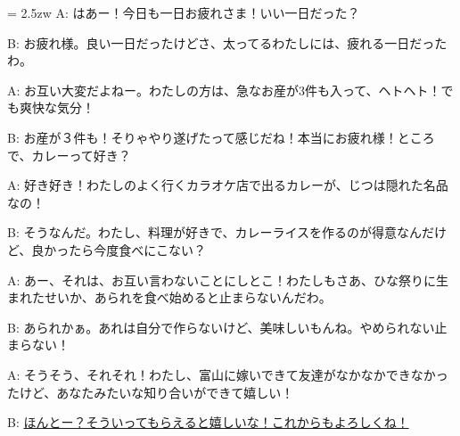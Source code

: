 \documentclass[11pt]{amsart}
\title{}
\author{}
\newenvironment{hangall}[1]{\hangindent = 2.5zw\everypar{\hangindent = 2.5zw}}{}
\begin{document}
\maketitle
\begin{hangall}{}%
A: はあー！今日も一日お疲れさま！いい一日だった？

B: お疲れ様。良い一日だったけどさ、太ってるわたしには、疲れる一日だったわ。

A: お互い大変だよねー。わたしの方は、急なお産が3件も入って、ヘトヘト！でも爽快な気分！

B: お産が３件も！そりゃやり遂げたって感じだね！本当にお疲れ様！ところで、カレーって好き？

A: 好き好き！わたしのよく行くカラオケ店で出るカレーが、じつは隠れた名品なの！

B: そうなんだ。わたし、料理が好きで、カレーライスを作るのが得意なんだけど、良かったら今度食べにこない？

A: あー、それは、お互い言わないことにしとこ！わたしもさあ、ひな祭りに生まれたせいか、あられを食べ始めると止まらないんだわ。

B: あられかぁ。あれは自分で作らないけど、美味しいもんね。やめられない止まらない！

A: そうそう、それそれ！わたし、富山に嫁いできて友達がなかなかできなかったけど、あなたみたいな知り合いができて嬉しい！

B: \ul{ほんとー？そういってもらえると嬉しいな！これからもよろしくね！}\end{hangall}
\end{document}
